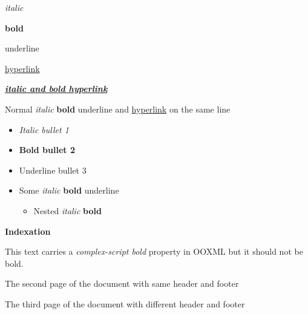 \documentclass[11pt,a4paper]{article}
\begin{document}
\textit{italic}

\textbf{bold}

underline

\href{https://github.com/DS4SD/docling}{hyperlink}

\href{https://github.com/DS4SD/docling}{\textit{\textbf{italic and bold hyperlink}}}

Normal \textit{italic} \textbf{bold} underline and \href{https://github.com/DS4SD/docling}{hyperlink} on the same line

\begin{itemize}
\item \textit{Italic bullet 1}
\item \textbf{Bold bullet 2}
\item Underline bullet 3
\item Some \textit{italic} \textbf{bold} underline
  \begin{itemize}
\item Nested \textit{italic} \textbf{bold}
  \end{itemize}
\end{itemize}

\textbf{Indexation}

This text carries a \textit{complex-script bold} property in OOXML but it should not be bold.

The second page of the document with same header and footer

The third page of the document with different header and footer
\end{document}
